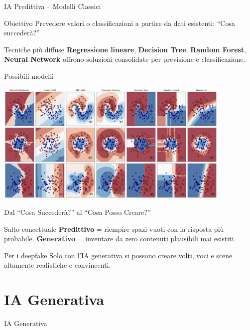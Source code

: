 \documentclass[12pt]{beamer}
\begin{document}
\begin{frame}{IA Predittiva – Modelli Classici}
  \begin{alertblock}{Obiettivo}
    Prevedere valori o classificazioni a partire da dati esistenti: “Cosa succederà?”
  \end{alertblock}
  \begin{alertblock}{Tecniche più diffuse}
    \textbf{Regressione lineare}, \textbf{Decision Tree}, \textbf{Random Forest}, \textbf{Neural Network} offrono soluzioni consolidate per previsione e classificazione.
  \end{alertblock}
\end{frame}


\begin{frame}{Possibili modelli}
  \begin{center}
    \includegraphics[width=0.85\textwidth]{Pic/dec.png}
  \end{center}
\end{frame}

\begin{frame}{Dal “Cosa Succederà?” al “Cosa Posso Creare?”}
  \begin{alertblock}{Salto concettuale}
    \textbf{Predittivo} = riempire spazi vuoti con la risposta più probabile.  
    \textbf{Generativo} = inventare da zero contenuti plausibili mai esistiti.
  \end{alertblock}
  \begin{alertblock}{Per i deepfake}
    Solo con l’IA generativa si possono creare volti, voci e scene altamente realistiche e convincenti.
  \end{alertblock}
\end{frame}

\section{IA Generativa}
\begin{frame}
\Huge
\begin{center}
IA Generativa
\end{center}
\end{frame}
\end{document}
